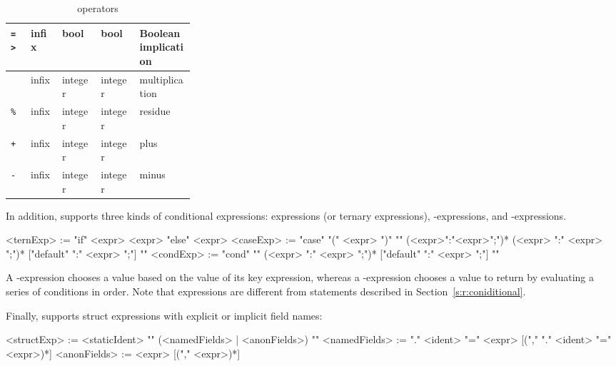 \begin{table}
\begin{small}
\begin{tabular}{|l|l|l|l|p{0.3\linewidth}|}
    \hline    
    {\tt\verb#=>#}                   & infix   & bool           & bool           & Boolean implication\\
    \hline    
    {\tt*}                           & infix   & integer        & integer        & multiplication \\
    \hline    
    {\tt\%}                          & infix   & integer        & integer        & residue \\
    \hline    
    {\tt+}                           & infix   & integer        & integer        & plus \\
    \hline    
    {\tt-}                           & infix   & integer        & integer        & minus \\
    \hline
\end{tabular}
\end{small}
\caption{\tsl operators}\label{t:ops}
\end{table}

In addition, \tsl supports three kinds of conditional expressions: 
 expressions (or ternary expressions), 
-expressions, and -expressions.  

\begin{bnflisting}
<ternExp> := "if" <expr> <expr> "else" <expr>
<caseExp> := "case" "(" <expr> ")" "{" (<expr>":"<expr>";")* 
                 (<expr> ":" <expr> ";")* 
                 ["default" ":" <expr> ";"]
            "}"
<condExp> := "cond" "{"
                  (<expr>    ":" <expr> ";")*
                  ["default" ":" <expr> ";"]
              "}"
\end{bnflisting}

A -expression chooses a value based on the value of its 
key expression, whereas a -expression chooses a value to 
return by evaluating a series of conditions in order.  Note that 
 expressions are different from  statements 
described in Section~\ref{s:r:coniditional}.

Finally, \tsl supports struct expressions with explicit or implicit 
field names:

\begin{bnflisting}
<structExp>   := <staticIdent> "{" 
                     (<namedFields> | <anonFields>) 
                 "}"
<namedFields> := "." <ident> "=" <expr> 
                 [("," "." <ident> "=" <expr>)*]
<anonFields> := <expr> 
                 [("," <expr>)*]
\end{bnflisting}

